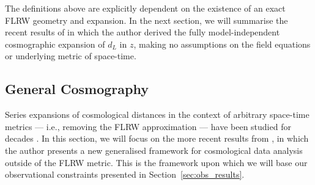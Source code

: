 \documentclass[fleqn,usenatbib]{mnras}
\begin{document}
The definitions {above} are explicitly dependent on the existence of an {exact} FLRW geometry {and expansion}. 
In the next section, we will summarise the recent results of \citet{Heinesen_2021} in which 
{the author derived} the {fully} model-independent {cosmographic} %
expansion of $d_L$ in $z$, making no assumptions on the {field equations or underlying} metric {of space-time}. 

\subsection{General Cosmography}
\label{sec:general_cosmog}

Series expansions of cosmological distances in the context of arbitrary space-time metrics --- i.e., removing the FLRW approximation --- have been studied for decades \citep[e.g.][]{Kristian_Sachs1966,Ellis_Nel_Maartens_Stoeger_Whitman_1985,Seitz1994LightPI,Clarkson_2011,Heinesen_2021}. 
{In this section,} we will focus on the more recent
results from \citet{Heinesen_2021}, in which the author presents a new generalised framework for cosmological data analysis outside of the FLRW metric. This is the framework upon which we will base our observational constraints presented in Section~\ref{sec:obs_results}. 
\end{document}
